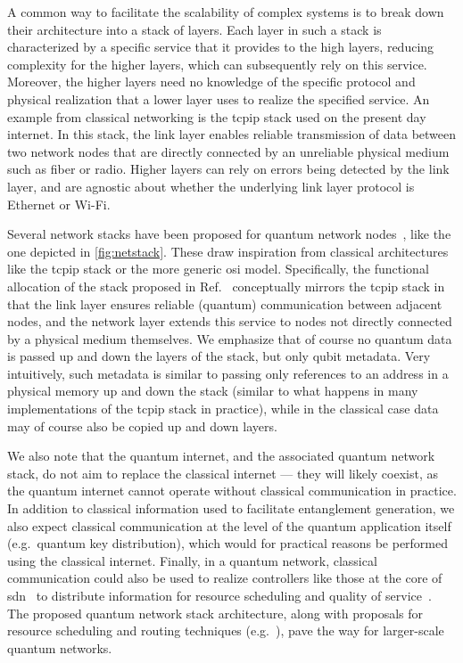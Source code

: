 A common way to facilitate the scalability of complex systems is to break down their architecture
into a stack of layers. Each layer in such a stack is characterized by a specific service that it
provides to the high layers, reducing complexity for the higher layers, which can subsequently rely
on this service. Moreover, the higher layers need no knowledge of the specific protocol and physical
realization that a lower layer uses to realize the specified service. An example from classical
networking is the \acrshort{tcpip} stack used on the present day internet. In this stack, the link
layer enables reliable transmission of data between two network nodes that are directly connected by
an unreliable physical medium such as fiber or radio. Higher layers can rely on errors being
detected by the link layer, and are agnostic about whether the underlying link layer protocol is
Ethernet or Wi-Fi.

Several network stacks have been proposed for quantum network nodes~\cite{dahlberg_2019_egp,
pirker_2019_quantum, kozlowski_2020_qnp}, like the one depicted in \cref{fig:netstack}. These draw
inspiration from classical architectures like the \acrshort{tcpip} stack or the more generic
\acrfull{osi} model. Specifically, the functional allocation of the stack proposed in
Ref.~\cite{dahlberg_2019_egp} conceptually mirrors the \acrshort{tcpip} stack in that the link layer
ensures reliable (quantum) communication between adjacent nodes, and the network layer extends this
service to nodes not directly connected by a physical medium themselves. We emphasize that of course
no quantum data is passed up and down the layers of the stack, but only qubit metadata. Very
intuitively, such metadata is similar to passing only references to an address in a physical memory
up and down the stack (similar to what happens in many implementations of the \acrshort{tcpip} stack
in practice), while in the classical case data may of course also be copied up and down layers.

We also note that the quantum internet, and the associated quantum network stack, do not aim to
replace the classical internet --- they will likely coexist, as the quantum internet cannot operate
without classical communication in practice. In addition to classical information used to facilitate
entanglement generation, we also expect classical communication at the level of the quantum
application itself (e.g.~quantum key distribution), which would for practical reasons be performed
using the classical internet. Finally, in a quantum network, classical communication could also be
used to realize controllers like those at the core of \acrfull{sdn}~\cite{ferguson_2021_orion} to
distribute information for resource scheduling and quality of service~\cite{skrzypczyk_2021_arch}.
The proposed quantum network stack architecture, along with proposals for resource scheduling and
routing techniques (e.g.~\cite{van_meter_2013_path, caleffi_2017_optimal,
gyongyosi_2018_decentralized, pant_2019_routing, chakraborty_2019_distributed, shi_2020_concurrent,
chakraborty_2020_entanglement, skrzypczyk_2021_arch}), pave the way for larger-scale quantum
networks.

